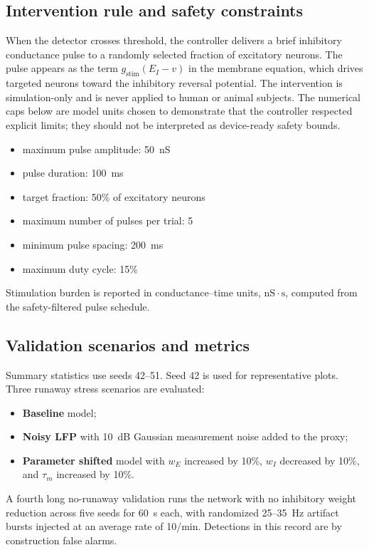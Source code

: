 \documentclass[12pt]{article}
\begin{document}
\subsection{Intervention rule and safety constraints}
When the detector crosses threshold, the controller delivers a brief inhibitory conductance pulse to a randomly selected fraction of excitatory neurons. The pulse appears as the term \(g_{\mathrm{stim}}(E_I-v)\) in the membrane equation, which drives targeted neurons toward the inhibitory reversal potential. The intervention is simulation-only and is never applied to human or animal subjects. The numerical caps below are model units chosen to demonstrate that the controller respected explicit limits; they should not be interpreted as device-ready safety bounds.

\begin{itemize}
    \item maximum pulse amplitude: 50~nS
    \item pulse duration: 100~ms
    \item target fraction: 50\% of excitatory neurons
    \item maximum number of pulses per trial: 5
    \item minimum pulse spacing: 200~ms
    \item maximum duty cycle: 15\%
\end{itemize}

Stimulation burden is reported in conductance--time units, $\mathrm{nS}\cdot\mathrm{s}$, computed from the safety-filtered pulse schedule.

\subsection{Validation scenarios and metrics}
Summary statistics use seeds 42--51. Seed 42 is used for representative plots. Three runaway stress scenarios are evaluated:
\begin{itemize}
    \item \textbf{Baseline} model;
    \item \textbf{Noisy LFP} with 10~dB Gaussian measurement noise added to the proxy;
    \item \textbf{Parameter shifted} model with \(w_E\) increased by 10\%, \(w_I\) decreased by 10\%, and \(\tau_m\) increased by 10\%.
\end{itemize}
A fourth long no-runaway validation runs the network with no inhibitory weight reduction across five seeds for 60~s each, with randomized 25--35~Hz artifact bursts injected at an average rate of 10/min. Detections in this record are by construction false alarms.
\end{document}
